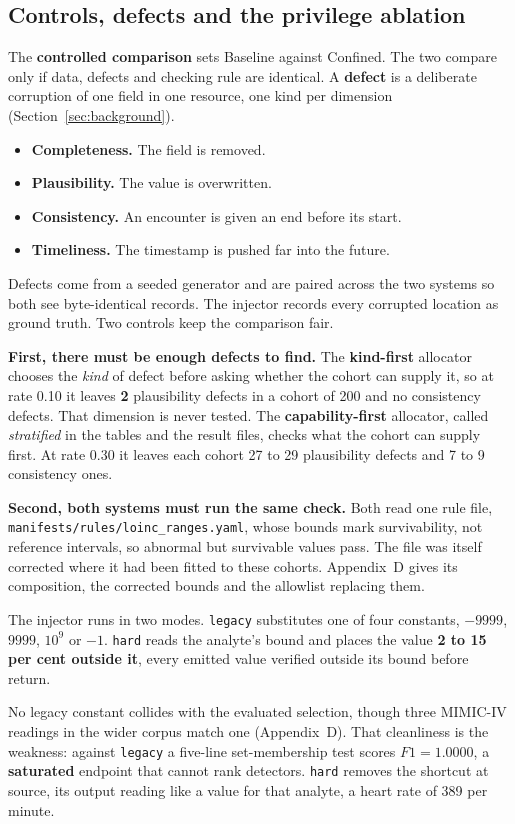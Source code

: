\subsection{Controls, defects and the privilege ablation}
\label{sec:fair}
\label{sec:ablationdesign}
\label{sec:injection}

The \textbf{controlled comparison} sets Baseline against Confined. The two compare only if data,
defects and checking rule are identical. A \textbf{defect} is a deliberate corruption of one field in
one resource, one kind per dimension (Section~\ref{sec:background}).

\begin{itemize}[leftmargin=1.4em, itemsep=0.15em]
  \item \textbf{Completeness.} The field is removed.
  \item \textbf{Plausibility.} The value is overwritten.
  \item \textbf{Consistency.} An encounter is given an end before its start.
  \item \textbf{Timeliness.} The timestamp is pushed far into the future.
\end{itemize}

Defects come from a seeded generator and are
paired across the two systems so both see byte-identical records. The injector records every
corrupted location as ground truth. Two controls keep the comparison fair.

\textbf{First, there must be enough defects to find.} The \textbf{kind-first} allocator chooses the
\emph{kind} of defect before asking whether the cohort can supply it, so at rate 0.10 it leaves
\textbf{2} plausibility defects in a cohort of 200 and no consistency defects. That dimension is
never tested. The \textbf{capability-first} allocator, called \emph{stratified} in the tables and the
result files, checks what the cohort can supply first. At rate 0.30 it leaves each cohort 27 to 29
plausibility defects and 7 to 9 consistency ones.

\textbf{Second, both systems must run the same check.} Both read one rule file,
\texttt{manifests/\allowbreak rules/\allowbreak loinc\_ranges.yaml}, whose bounds mark survivability,
not reference intervals, so abnormal but survivable values pass. The file was itself corrected where
it had been fitted to these cohorts. Appendix~D gives its composition, the corrected bounds and the
allowlist replacing them.

The injector runs in two modes. \texttt{legacy} substitutes one of four constants, $-9999$, $9999$,
$10^9$ or $-1$. \texttt{hard} reads the analyte's bound and places the value \textbf{2 to 15 per cent
outside it}, every emitted value verified outside its bound before return.

No legacy constant collides with the evaluated selection, though three MIMIC-IV readings in the wider
corpus match one (Appendix~D). That cleanliness is the weakness: against \texttt{legacy} a five-line
set-membership test scores $F1 = 1.0000$, a \textbf{saturated} endpoint that cannot rank detectors.
\texttt{hard} removes the shortcut at source, its output reading like a value for that analyte, a
heart rate of 389 per minute.
